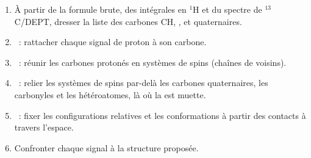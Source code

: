 \begin{method}\label{met:b3:advanced-nmr:solve-2d}
\begin{enumerate}
  \item À partir de la formule brute, des intégrales en ${}^1$H et du
        spectre de ${}^{13}$C/DEPT, dresser la liste
        des carbones CH, ,  et quaternaires.
  \item {}~: rattacher chaque signal de proton à son carbone.
  \item {}~: réunir les carbones protonés en systèmes de spins (chaînes
        de voisins).
  \item {}~: relier les systèmes de spins par-delà les carbones
        quaternaires, les carbonyles et les hétéroatomes, là où la 
        est muette.
  \item {}~: fixer les configurations relatives et les conformations
        à partir des contacts à travers l'espace.
  \item Confronter chaque signal à la structure proposée.
\end{enumerate}
\end{method}

